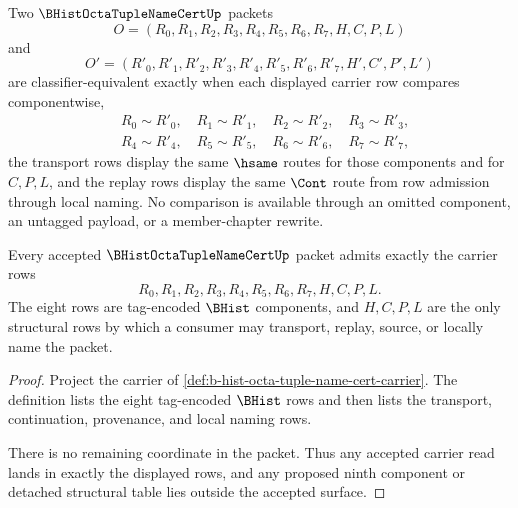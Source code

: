 \begin{definition}
\label{def:b-hist-octa-tuple-name-cert-classifier}
Two $\BHistOctaTupleNameCertUp$ packets
$$
O=(R_0,R_1,R_2,R_3,R_4,R_5,R_6,R_7,H,C,P,L)
$$
and
$$
O'=(R'_0,R'_1,R'_2,R'_3,R'_4,R'_5,R'_6,R'_7,H',C',P',L')
$$
are classifier-equivalent exactly when each displayed carrier row compares componentwise,
$$
\begin{aligned}
&R_0 \sim R'_0,\quad R_1 \sim R'_1,\quad R_2 \sim R'_2,\quad R_3 \sim R'_3,\\
&R_4 \sim R'_4,\quad R_5 \sim R'_5,\quad R_6 \sim R'_6,\quad R_7 \sim R'_7,
\end{aligned}
$$
the transport rows display the same $\hsame$ routes for those components and for $C,P,L$, and the replay rows display the same $\Cont$ route from row admission through local naming. No comparison is available through an omitted component, an untagged payload, or a member-chapter rewrite.
\end{definition}

\begin{theorem}
\label{thm:b-hist-octa-tuple-name-cert-carrier-admission}
Every accepted $\BHistOctaTupleNameCertUp$ packet admits exactly the carrier rows
$$
R_0,R_1,R_2,R_3,R_4,R_5,R_6,R_7,H,C,P,L.
$$
The eight rows are tag-encoded $\BHist$ components, and $H,C,P,L$ are the only structural rows by which a consumer may transport, replay, source, or locally name the packet.
\end{theorem}
\begin{proof}
Project the carrier of \autoref{def:b-hist-octa-tuple-name-cert-carrier}. The definition lists the eight tag-encoded $\BHist$ rows and then lists the transport, continuation, provenance, and local naming rows.

There is no remaining coordinate in the packet. Thus any accepted carrier read lands in exactly the displayed rows, and any proposed ninth component or detached structural table lies outside the accepted surface.
\end{proof}

